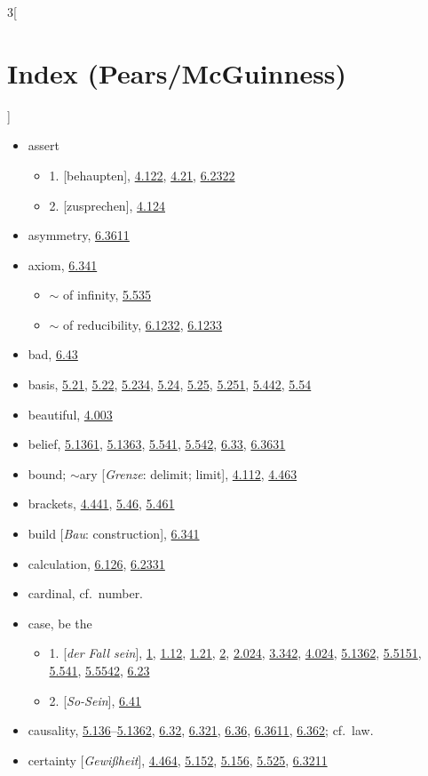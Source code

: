 \documentclass[oneside,openany,12pt]{book}
\newcommand{\indexentry}[1]{\item #1}
\newcommand{\indexsubentry}[1]{\begin{itemize} \item #1 \end{itemize}}
\newcommand{\indexref}[1]{\hyperlink{prop#1}{#1}}
\newcommand{\indexgap}{\bigskip}
\begin{document}
\begin{multicols}{3}[\section*{Index (Pears/McGuinness)}]
\begin{itemize}
\indexentry{assert}

   \indexsubentry{1. [behaupten],  \indexref{4.122}, \indexref{4.21}, \indexref{6.2322}}

   \indexsubentry{2. [zusprechen], \indexref{4.124}}

\indexentry{asymmetry, \indexref{6.3611}}

\indexentry{axiom, \indexref{6.341}}

   \indexsubentry{$\sim$ of infinity, \indexref{5.535}}

   \indexsubentry{$\sim$ of reducibility, \indexref{6.1232}, \indexref{6.1233}}

\indexgap

\indexentry{bad, \indexref{6.43}}

\indexentry{basis, \indexref{5.21}, \indexref{5.22}, \indexref{5.234}, \indexref{5.24}, \indexref{5.25}, \indexref{5.251}, \indexref{5.442}, \indexref{5.54}}

\indexentry{beautiful, \indexref{4.003}}

\indexentry{belief, \indexref{5.1361}, \indexref{5.1363}, \indexref{5.541}, \indexref{5.542}, \indexref{6.33}, \indexref{6.3631}}

\indexentry{bound; $\sim$ary [\textit{Grenze}: delimit; limit], \indexref{4.112}, \indexref{4.463}}

\indexentry{brackets, \indexref{4.441}, \indexref{5.46}, \indexref{5.461}}

\indexentry{build [\textit{Bau}: construction], \indexref{6.341}}

\indexgap

\indexentry{calculation, \indexref{6.126}, \indexref{6.2331}}

\indexentry{cardinal, cf.\ number.}

\indexentry{case, be the}

   \indexsubentry{1. [\textit{der Fall sein}], \indexref{1}, \indexref{1.12}, \indexref{1.21}, \indexref{2}, \indexref{2.024}, \indexref{3.342}, \indexref{4.024}, \indexref{5.1362}, \indexref{5.5151}, \indexref{5.541}, \indexref{5.5542}, \indexref{6.23}}

   \indexsubentry{2. [\textit{So-Sein}], \indexref{6.41}}

\indexentry{causality, \indexref{5.136}--\indexref{5.1362}, \indexref{6.32}, \indexref{6.321}, \indexref{6.36}, \indexref{6.3611}, \indexref{6.362}; cf.\ law.}

\indexentry{certainty [\textit{Gewi{\ss}heit}], \indexref{4.464}, \indexref{5.152}, \indexref{5.156}, \indexref{5.525}, \indexref{6.3211}}


\end{itemize}
\end{multicols}
\end{document}
